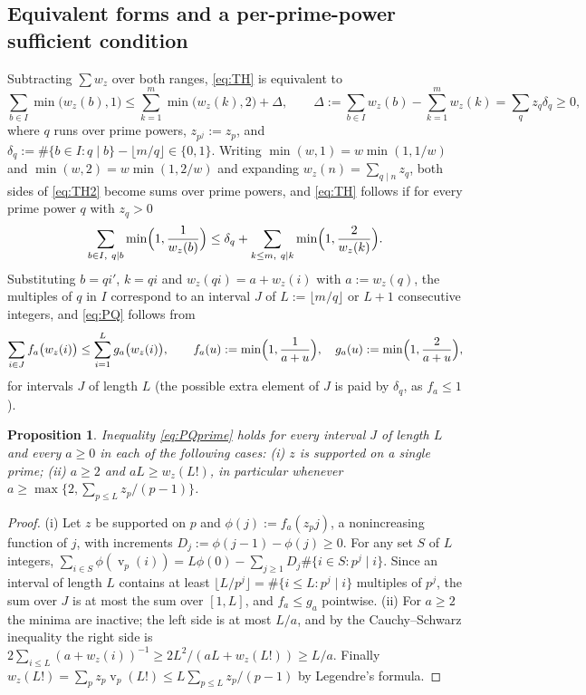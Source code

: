 \documentclass[11pt]{article}
\newtheorem{proposition}[theorem]{Proposition}
\theoremstyle{definition}
\DeclareMathOperator{\vp}{v}
\begin{document}
\subsection*{Equivalent forms and a per-prime-power sufficient condition}
Subtracting $\sum w_z$ over both ranges, \eqref{eq:TH} is equivalent to
\begin{equation}\label{eq:TH2}
\sum_{b\in I}\min\bigl(w_z(b),1\bigr)\le\sum_{k=1}^{m}\min\bigl(w_z(k),2\bigr)+\Delta,\qquad
\Delta:=\sum_{b\in I}w_z(b)-\sum_{k=1}^{m}w_z(k)=\sum_{q}z_q\delta_q\ge0,
\end{equation}
where $q$ runs over prime powers, $z_{p^j}:=z_p$, and $\delta_q:=\#\{b\in I:q\mid b\}-\lfloor m/q\rfloor\in\{0,1\}$.
Writing $\min(w,1)=w\min(1,1/w)$ and $\min(w,2)=w\min(1,2/w)$ and expanding $w_z(n)=\sum_{q\mid n}z_q$, both sides of
\eqref{eq:TH2} become sums over prime powers, and \eqref{eq:TH} follows if for every prime power $q$ with $z_q>0$
\begin{equation}\label{eq:PQ}
\sum_{b\in I,\ q\mid b}\min\Bigl(1,\frac1{w_z(b)}\Bigr)\le\delta_q+\sum_{k\le m,\ q\mid k}\min\Bigl(1,\frac2{w_z(k)}\Bigr).
\end{equation}
Substituting $b=qi'$, $k=qi$ and $w_z(qi)=a+w_z(i)$ with $a:=w_z(q)$, the multiples of $q$ in $I$ correspond to an
interval $J$ of $L:=\lfloor m/q\rfloor$ or $L+1$ consecutive integers, and \eqref{eq:PQ} follows from
\begin{equation}\label{eq:PQprime}
\sum_{i\in J}f_a\bigl(w_z(i)\bigr)\le\sum_{i=1}^{L}g_a\bigl(w_z(i)\bigr),\qquad
f_a(u):=\min\Bigl(1,\frac1{a+u}\Bigr),\quad g_a(u):=\min\Bigl(1,\frac2{a+u}\Bigr),
\end{equation}
for intervals $J$ of length $L$ (the possible extra element of $J$ is paid by $\delta_q$, as $f_a\le1$).

\begin{proposition}\label{prop:PQcases}
Inequality \eqref{eq:PQprime} holds for every interval $J$ of length $L$ and every $a\ge0$ in each of the following
cases: (i) $z$ is supported on a single prime; (ii) $a\ge2$ and $aL\ge w_z(L!)$, in particular whenever
$a\ge\max\{2,\sum_{p\le L}z_p/(p-1)\}$.
\end{proposition}
\begin{proof}
(i) Let $z$ be supported on $p$ and $\phi(j):=f_a(z_pj)$, a nonincreasing function of $j$, with increments
$D_j:=\phi(j-1)-\phi(j)\ge0$. For any set $S$ of $L$ integers,
$\sum_{i\in S}\phi(\vp_p(i))=L\phi(0)-\sum_{j\ge1}D_j\#\{i\in S:p^j\mid i\}$. Since an interval of length $L$
contains at least $\lfloor L/p^j\rfloor=\#\{i\le L:p^j\mid i\}$ multiples of $p^j$, the sum over $J$ is at most the
sum over $[1,L]$, and $f_a\le g_a$ pointwise. (ii) For $a\ge2$ the minima are inactive; the left side is at most
$L/a$, and by the Cauchy--Schwarz inequality the right side is
$2\sum_{i\le L}(a+w_z(i))^{-1}\ge 2L^2/(aL+w_z(L!))\ge L/a$. Finally
$w_z(L!)=\sum_pz_p\vp_p(L!)\le L\sum_{p\le L}z_p/(p-1)$ by Legendre's formula.
\end{proof}
\end{document}
